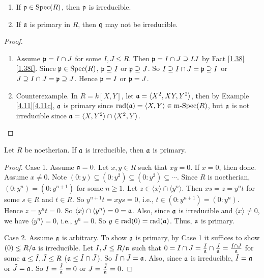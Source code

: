 \begin{example}\label{4.14}
    \begin{enumerate}
        \item If $\mathfrak{p} \in \operatorname{Spec}(R)$, then $\mathfrak{p}$ is irreducible.
        \item If $\mathfrak{a}$ is primary in $R$, then $\mathfrak{q}$ may not be irreducible.
    \end{enumerate}
\end{example}

\begin{proof}
    \begin{enumerate}
        \item
            Assume $\mathfrak{p} = I \cap J$ for some $I,J \leq R$. Then $\mathfrak{p} = I \cap J \supseteq IJ$ by Fact \ref{1.38}\ref{1.38f}. Since $\mathfrak{p} \in \operatorname{Spec}(R)$, $\mathfrak{p} \supseteq I$ or $\mathfrak{p} \supseteq J$. So $I \supseteq I \cap J = \mathfrak{p} \supseteq I$ or $J \supseteq I \cap J = \mathfrak{p} \supseteq J$. Hence $\mathfrak{p} = I$ or $\mathfrak{p} = J$. 
        \item 
            Counterexample. In $R = k[X,Y]$, let $\mathfrak{a} = \langle X^{2},XY,Y^{2} \rangle$, then by Example \ref{4.11}\ref{4.11c}, $\mathfrak{a}$ is primary since $\operatorname{rad}(\mathfrak{a}) = \langle X,Y \rangle \in \operatorname{m-Spec}(R)$, but $\mathfrak{a}$ is not irreducible since $\mathfrak{a} = \langle X,Y^{2} \rangle \cap \langle X^{2},Y \rangle$. \qedhere
    \end{enumerate}
\end{proof}

\begin{proposition}\label{4.15}
    Let $R$ be noetherian. If $\mathfrak{a}$ is irreducible, then $\mathfrak{a}$ is primary.
\end{proposition}

\begin{proof}
    Case 1. Assume $\mathfrak{a} = 0$. Let $x,y \in R$ such that $xy = 0$. If $x = 0$, then done. Assume $x \neq 0$. Note $(0:y) \subseteq (0:y^{2}) \subseteq (0:y^{3}) \subseteq \cdots$. Since $R$ is noetherian, $(0:y^{n}) = (0:y^{n+1})$ for some $n \geq 1$. Let $z \in \langle x \rangle \cap \langle y^{n} \rangle$. Then $xs = z = y^{n}t$ for some $s \in R$ and $t \in R$. So $y^{n+1}t = xys = 0$, i.e., $t \in (0:y^{n+1}) = (0:y^{n})$. Hence $z = y^{n}t = 0$. So $\langle x \rangle \cap \langle y^{n} \rangle = 0 = \mathfrak{a}$. Also, since $\mathfrak{a}$ is irreducible and $\langle x \rangle \neq 0$, we have $\langle y^{n} \rangle = 0$, i.e., $y^{n} = 0$. So $y \in \operatorname{rad}(0) = \operatorname{rad}(\mathfrak{a})$. Thus, $\mathfrak{a}$ is primary. \par 
    Case 2. Assume $\mathfrak{a}$ is arbitrary. To show $\mathfrak{a}$ is primary, by Case 1 it suffices to show $(0) \lneq R/\mathfrak{a}$ is irreducible. Let $I,J \leq R/\mathfrak{a}$ such that $0 = I \cap J = \frac{\tilde I}{\mathfrak{a}} \cap \frac{\tilde J}{\mathfrak{a}} = \frac{\tilde I \cap \tilde J}{\mathfrak{a}}$ for some $\mathfrak{a} \leq \tilde I,\tilde J \leq R$ ($\mathfrak{a} \leq \tilde I \cap \tilde J$). So $\tilde I \cap \tilde J = \mathfrak{a}$. Also, since $\mathfrak{a}$ is irreducible, $\tilde I = \mathfrak{a}$ or $\tilde J = \mathfrak{a}$. So $I = \frac{\tilde I}{\mathfrak{a}} = 0$ or $J = \frac{\tilde J}{\mathfrak{a}} = 0$. 
\end{proof}

